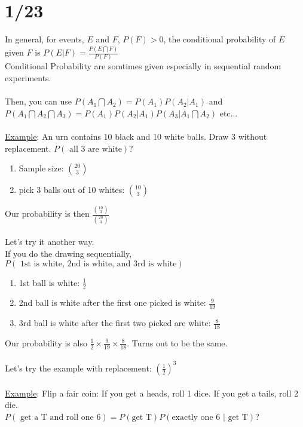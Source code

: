 \section*{1/23}
  In general, for events, $E$ and $F$, $P(F) > 0$, the conditional probability
  of $E$ given $F$ is $P(E|F) = \frac{P(E \bigcap F)}{P(F)}$\\
  Conditional Probability are somtimes given especially in sequential random
  experiments.\\\\
  Then, you can use $P(A_1 \bigcap A_2) = P(A_1)P(A_2 | A_1)$ and
  $P(A_1 \bigcap A_2 \bigcap A_3) = P(A_1) P(A_2 | A_1) P(A_3 | A_1 \bigcap 
  A_2)$ etc...\\\\
  \underline{Example}: An urn contains 10 black and 10 white balls. Draw
  3 without replacement. $P(\text{ all 3 are white})$?\\
  \begin{enumerate}
    \item Sample size: $\binom{20}{3}$ 
    \item pick 3 balls out of 10 whites: $\binom{10}{3}$
  \end{enumerate}
  Our probability is then $\frac{\binom{10}{3}}{\binom{20}{3}}$\\\\
  Let's try it another way.\\
  If you do the drawing sequentially, $P(\text{ 1st is white, 2nd is
  white, and 3rd is white})$\\
  \begin{enumerate}
    \item 1st ball is white: $\frac{1}{2}$
    \item 2nd ball is white after the first one picked is white: $\frac{9}{19}$
    \item 3rd ball is white after the first two picked are white:
      $\frac{8}{18}$
  \end{enumerate}
  Our probability is also $\frac{1}{2} \times \frac{9}{19} \times 
    \frac{8}{18}$. Turns out to be the same.\\\\
  Let's try the example with replacement: $\left(\frac{1}{2}\right)^3$\\\\
  \underline{Example}: Flip a fair coin: If you get a heads, roll 1 dice.
  If you get a tails, roll 2 die.\\
  $P(\text{ get a T and roll one 6}) = P(\text{get T}) P(\text{exactly one
  6 $|$ get T})$?\\

